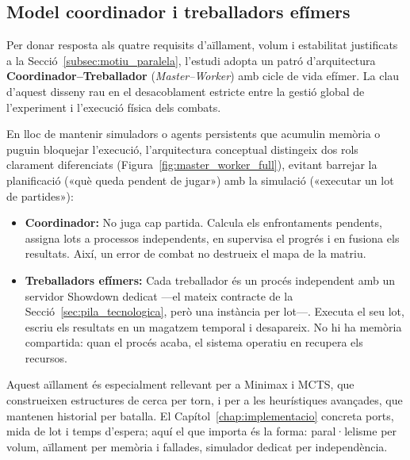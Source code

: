 \subsection{Model coordinador i treballadors efímers}

Per donar resposta als quatre requisits d'aïllament, volum i estabilitat justificats a la Secció~\ref{subsec:motiu_paralela}, l'estudi adopta un patró d'arquitectura \textbf{Coordinador--Treballador} (\emph{Master--Worker}) amb cicle de vida efímer. La clau d'aquest disseny rau en el desacoblament estricte entre la gestió global de l'experiment i l'execució física dels combats.

En lloc de mantenir simuladors o agents persistents que acumulin memòria o puguin bloquejar l'execució, l'arquitectura conceptual distingeix dos rols clarament diferenciats (Figura~\ref{fig:master_worker_full}), evitant barrejar la planificació («què queda pendent de jugar») amb la simulació («executar un lot de partides»):

\begin{itemize}
    \item \textbf{Coordinador:} No juga cap partida. Calcula els enfrontaments pendents, assigna lots a processos independents, en supervisa el progrés i en fusiona els resultats. Així, un error de combat no destrueix el mapa de la matriu.
    \item \textbf{Treballadors efímers:} Cada treballador és un procés independent amb un servidor Showdown dedicat ---el mateix contracte de la Secció~\ref{sec:pila_tecnologica}, però una instància per lot---. Executa el seu lot, escriu els resultats en un magatzem temporal i desapareix. No hi ha memòria compartida: quan el procés acaba, el sistema operatiu en recupera els recursos.
\end{itemize}

Aquest aïllament és especialment rellevant per a Minimax i MCTS, que construeixen estructures de cerca per torn, i per a les heurístiques avançades, que mantenen historial per batalla. El Capítol~\ref{chap:implementacio} concreta ports, mida de lot i temps d'espera; aquí el que importa és la forma: paral·lelisme per volum, aïllament per memòria i fallades, simulador dedicat per independència.


